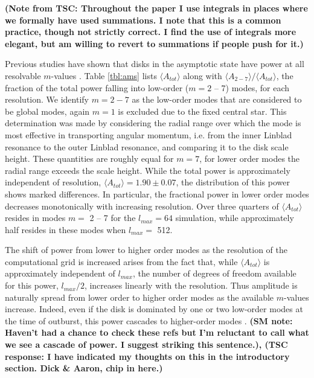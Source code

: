 \documentclass[manuscript]{aastex}
\begin{document}
{\bf (Note from TSC: Throughout the paper I use integrals in places where we 
formally have used summations.  I note that this is a common practice, though
not strictly correct.  I find the use of integrals more elegant, but am willing to
revert to summations if people push for it.)}

Previous studies have shown that disks in the asymptotic state have power at all resolvable $m$-values  \citep{lodato2004,mejia2005,boley2006,cossins2009}.  Table \ref{tbl:ams} lists $\langle A_{tot} \rangle$ along with $\langle A_{2-7} \rangle  /  \langle A_{tot} \rangle$,  the fraction of the total power falling into low-order ($m = 2$ -- 7) modes, for each resolution. We identify $m=2-7$ as the low-order modes that are considered to be global modes, again 
$m=1$ is excluded due to the fixed central star. This determination was made by considering the radial range over 
which the mode is most effective in transporting angular momentum, i.e. from the inner Linblad resonance to the outer 
Linblad resonance, and comparing it to the disk scale height. These quantities are roughly equal for $m=7$, for lower 
order modes the radial range exceeds the scale height.
While the total power is approximately independent of resolution, $\langle A_{tot} \rangle = 1.90 \pm 0.07$, 
the distribution of this power shows marked differences. In particular, the fractional power in lower order modes decreases monotonically with increasing resolution.  Over three quarters of $\langle A_{tot} \rangle$ resides
in modes $m =$ 2 -- 7 for the $l_{max} = 64$ simulation, while approximately half resides in these modes when $l_{max} =$ 512.

The shift of power from lower to higher order modes as the resolution of the computational grid is increased arises from the fact that, while $\langle A_{tot} \rangle$ is approximately independent of $l_{max}$,  the number of degrees of freedom available for this power, $l_{max}/2$, increases linearly with the resolution. Thus amplitude is naturally spread from lower order to higher order modes as the available $m$-values increase. Indeed, even if the disk is dominated by one or two low-order modes at the time of outburst, this power cascades to higher-order modes \citep[for example][]{laughlin1997, laughlin1998,laughlin1996}. {\bf (SM note: Haven't had a chance to check these refs but I'm reluctant to call what we see a cascade of power. I suggest striking this sentence.), (TSC response: I have indicated my thoughts on this in the introductory section.  Dick \& Aaron, chip in here.)}
\end{document}
